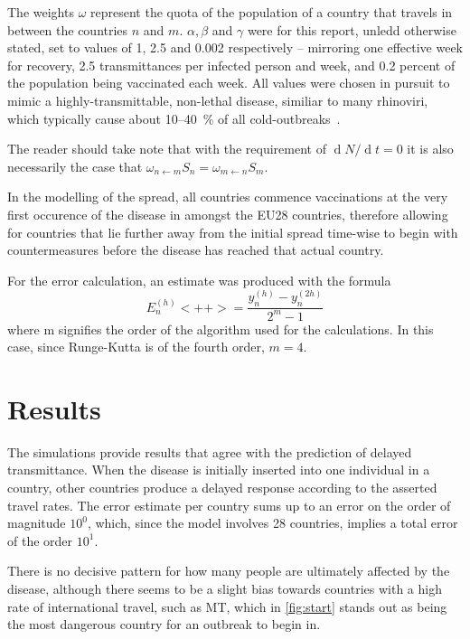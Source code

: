 \documentclass[a4paper,12pt]{article}
\renewcommand{\d}[1]{\ensuremath{\operatorname{d}\!{#1}}} %
\theoremstyle{plain}
\theoremstyle{definition}
\begin{document}
   The weights $\omega$ represent the quota of the population of a country that
   travels in between the countries $n$ and $m$. $\alpha, \beta$ and $\gamma$
   were for this report, unledd otherwise stated, set to values of 1, 2.5 and 
   0.002 respectively -- mirroring one effective week for recovery, 2.5 
   transmittances per infected person and week, and 0.2 percent of the population 
   being vaccinated each week. All values were chosen in pursuit to mimic a
   highly-transmittable, non-lethal disease, similiar to many
   rhinoviri, which typically cause about 10--40~\% of all
   cold-outbreaks~\cite{rhino}. 
   
   The reader should take note
   that with the requirement of $\d N/\d t = 0$ it is also necessarily the case 
   that $\omega_{n\leftarrow m} S_n = \omega_{m \leftarrow n}S_m$. 

   In the modelling of the spread, all countries commence vaccinations at the
   very first occurence of the disease in amongst the EU28 countries, therefore
   allowing for countries that lie further away from the initial spread
   time-wise to begin with countermeasures before the disease has reached that
   actual country.

   For the error calculation, an estimate was produced with the formula
   \begin{equation}
      E_n^{(h)}<++> = \frac{y_n^{(h)} - y_n^{(2h)}}{2^m -1}
      \label{eq:err}
   \end{equation}
   where m signifies the order of the algorithm used for the calculations. In
   this case, since Runge-Kutta is of the fourth order, $m=4$.
   
\section*{Results}
   The simulations provide results that agree with the prediction of delayed
   transmittance. When the disease is initially inserted into one individual in
   a country, other countries produce a delayed response according to the
   asserted travel rates. The error estimate per country sums up to an error on
   the order of magnitude $10^{0}$, which, since the model involves 28
   countries, implies a total error of the order $10^{1}$.
   
   There is no decisive pattern for how many people are ultimately affected by 
   the disease, although there seems to be a slight bias towards countries with 
   a high rate of international travel, such as MT, which in \cref{fig:start} 
   stands out as being the most dangerous country for an outbreak to begin in. 
\end{document}
